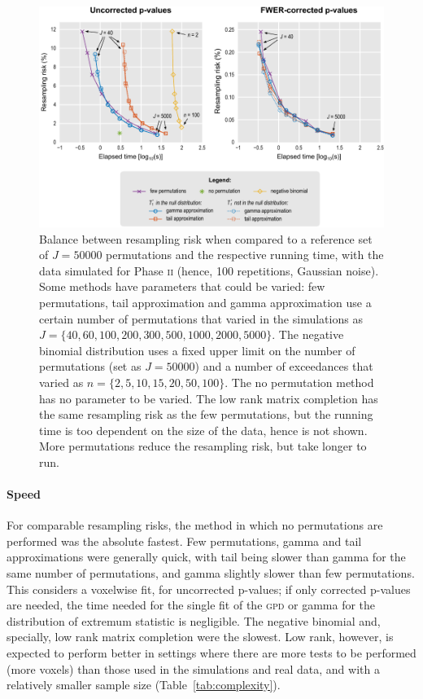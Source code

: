 \begin{figure}[!p]
\hspace*{-5mm}\includegraphics[scale=.9]{figures/risk+timing.pdf}
\caption{Balance between resampling risk when compared to a reference set of $J=50000$ permutations and the respective running time, with the data simulated for Phase \textsc{ii} (hence, 100 repetitions, Gaussian noise). Some methods have parameters that could be varied: few permutations, tail approximation and gamma approximation use a certain number of permutations that varied in the simulations as $J = \{40, 60, 100, 200, 300, 500, 1000, 2000, 5000\}$. The negative binomial distribution uses a fixed upper limit on the number of permutations (set as $J=50000$) and a number of exceedances that varied as $n=\{2, 5, 10, 15, 20, 50, 100\}$. The no permutation method has no parameter to be varied. The low rank matrix completion has the same resampling risk as the few permutations, but the running time is too dependent on the size of the data, hence is not shown. More permutations reduce the resampling risk, but take longer to run.}
\label{fig:risk+timing}
\end{figure}

\paragraph{Speed} For comparable resampling risks, the method in which no permutations are performed was the absolute fastest. Few permutations, gamma and tail approximations were generally quick, with tail being slower than gamma for the same number of permutations, and gamma slightly slower than few permutations. This considers a voxelwise fit, for uncorrected p-values; if only corrected p-values are needed, the time needed for the single fit of the \textsc{gpd} or gamma for the distribution of extremum statistic is negligible. The negative binomial and, specially, low rank matrix completion were the slowest. Low rank, however, is expected to perform better in settings where there are more tests to be performed (more voxels) than those used in the simulations and real data, and with a relatively smaller sample size (Table~\ref{tab:complexity}).

